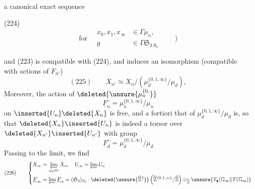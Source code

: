 

  a canonical exact sequence

\noindent (224)\quad
{}
\[
\text{for}\quad\begin{aligned}x_0,x_1,x_{\infty}&\in\Gamma\mu_n,\\g&\in\Gamma\mathfrak S_{3\,S_0}\end{aligned}\qquad\big)
\]

and  (223) is compatible with (224), and induces an isomorphism (compatible with actions of $F_{n'}$)
\[
(225)\qquad X_{n'}\simeq X_n/(\mu_d^{\{0,1,\infty\}}/\mu_d),
\]
Moreover, the action of $\deleted{\unsure{\mu_n^{\{0,}}}$
\[
\underline F_n^{\circ}=\mu_n^{\{0,1,\infty\}}/\mu_n
\]
on $\inserted{U_n}\deleted{X_n}$ is free, and a fortiori that of $\mu_d^{\{0,1,\infty\}}/\mu_d$ is, so that $\deleted{X_n}\inserted{U_n}$ is indeed a torsor over $\deleted{X_{n'}}\inserted{U_{n'}}$ with group
\[
\underline F_d^{\circ}=\mu_d^{\{0,1,\infty\}}/\mu_d
\]
Passing to the limit, we find
\[
(226)\qquad\left\{\begin{aligned}
X_{\infty}&=\varprojlim_{n\in\mathbb N^{*}}X_n,\quad U_{\infty}=\varprojlim U_n\\
\underline F_{\infty}&=\varprojlim\underline F_n=(\mathfrak S_3)_{S_0}\mathbin{\cdot}\deleted{\unsure{\widehat{\mathbb Z}^{2}}}\left(\widehat{\mathbb Z}^{\{0,1,\infty\}}/\widehat{\mathbb Z}\right)\otimes_{\widehat{\mathbb Z}}\unsure{T_{\bullet}(\mathbb G_m)|T(\mathbb G_m)}
\end{aligned}\right.
\]


